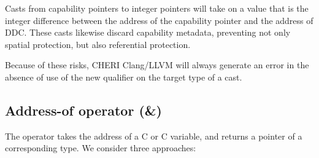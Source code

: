 \documentclass[12pt,twoside,openright,a4paper]{article}
\newcommand{\ccode}[1]{{\small\ttfamily{#1}}}
\newcommand{\note}[2]{{\color{blue}[ Note: #1 - #2]}}
\renewcommand{\note}[2]{\relax\ifhmode\unskip\fi}
\newcommand{\bdnote}[1]{\note{#1}{Brooks D.}}
\newcommand{\rwnote}[1]{\note{#1}{Robert W.}}
\newcommand{\psnote}[1]{\note{#1}{Peter S.}}
\newcommand{\dcnote}[1]{\note{#1}{David}}
\newcommand*{\cpp}{\texorpdfstring{C\textsmaller[2]{\protect\nolinebreak[4]\hspace{-.05em}\raisebox{.45ex}{\textbf{++}}}}{C++}}
\begin{document}
\psnote{terminology: it's pretty easy to misread ``integer pointer'' as ``pointer to integer'', as that's normal C usage.  Maybe we can find a different term?  ``machine-word pointer'' ??}

Casts from capability pointers to integer pointers will take on a value that
is the integer difference between the address of the capability pointer and
the address of DDC.
These casts likewise discard capability metadata, preventing not only spatial
protection, but also referential protection.

Because of these risks, CHERI Clang/LLVM will always generate an error in
the absence of use of the new \ccode{\_\_cheri\_fromcap} qualifier on the
target type of a cast.

\rwnote{Say something about the associated built-ins?}

\rwnote{Give examples of warnings?}

\dcnote{We used to have instructions for this.  The goal for systems without
that was cap -> int pointer casts would do a CTestSubset, CSub, CCMOV sequence,
so casting from a not-in-DDC cap to an integer pointer would give either a
valid pointer or null.  The programmer invariant is that either the resulting
pointer can be used to access the entire object, or it is a detectable null.
The LLVM IR language reference now include this guarantee for address space
casts.}

\bdnote{In the CheriBSD kernel \ccode{\_\_cheri\_fromcap} is commonly used
for kernel-addresses that happen to be stored in capabilities,
but probably should be replaced by a macro that ensures that this is true
on systems where DDC includes userspace addresses (all of them today).}

\subsection{Address-of operator (\&)}

The \ccode{\&} operator takes the address of a C or \cpp{} variable, and
returns a pointer of a corresponding type.
We consider three approaches:
\end{document}
